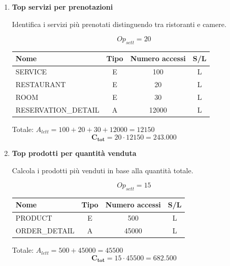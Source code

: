 \documentclass[a4paper,12pt]{report}
\begin{document}
\begin{enumerate}
    \item {\large \textbf{Top servizi per prenotazioni}} \label{op1}
    
    Identifica i servizi più prenotati distinguendo tra ristoranti e camere.
    
    $$Op_{sett} = 20$$
    
    \begin{table}[H]
        \centering
        \small
        \renewcommand{\arraystretch}{1.15}
        \begin{tabularx}{0.9\textwidth}{|X|c|c|c|}
            \hline
            \rowcolor{gray!20}
            \textbf{Nome} & \textbf{Tipo} & \textbf{Numero accessi} & \textbf{S/L} \\
            \hline
            SERVICE & E & 100 & L \\
            RESTAURANT & E & 20 & L \\
            ROOM & E & 30 & L \\
            RESERVATION\_DETAIL & A & 12000 & L \\
            \hline
        \end{tabularx}
    \end{table}
    
    Totale: $A_{lett} = 100 + 20 + 30 + 12000 = 12150$
    $$\mathbf{C_{tot}} = 20 \cdot 12150 = \mathbf{243.000}$$

    \item {\large \textbf{Top prodotti per quantità venduta}} \label{op2}
    
    Calcola i prodotti più venduti in base alla quantità totale.
    
    $$Op_{sett} = 15$$
    
    \begin{table}[H]
        \centering
        \small
        \renewcommand{\arraystretch}{1.15}
        \begin{tabularx}{0.9\textwidth}{|X|c|c|c|}
            \hline
            \rowcolor{gray!20}
            \textbf{Nome} & \textbf{Tipo} & \textbf{Numero accessi} & \textbf{S/L} \\
            \hline
            PRODUCT & E & 500 & L \\
            ORDER\_DETAIL & A & 45000 & L \\
            \hline
        \end{tabularx}
    \end{table}
    
    Totale: $A_{lett} = 500 + 45000 = 45500$
    $$\mathbf{C_{tot}} = 15 \cdot 45500 = \mathbf{682.500}$$


\end{enumerate}
\end{document}
